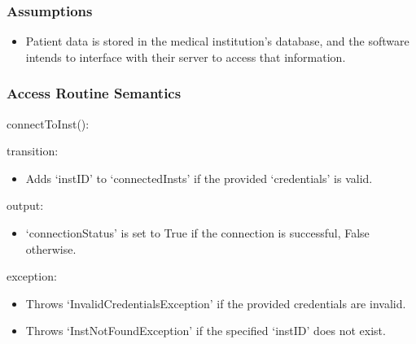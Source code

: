 \documentclass[12pt, titlepage]{article}
\begin{document}
\subsubsection{Assumptions}
\begin{itemize}
  \item Patient data is stored in the medical institution's database, and the software intends to interface with their server to access that information.
\end{itemize}

\subsubsection{Access Routine Semantics}

\noindent connectToInst():
\begin{itemize}
  \begin{item}
    transition:
    \begin{itemize}
      \item Adds `instID' to `connectedInsts' if the provided `credentials' is
        valid.
    \end{itemize}
  \end{item}
  \begin{item}
    output:
    \begin{itemize}
      \item `connectionStatus' is set to True if the connection is successful,
        False otherwise.
    \end{itemize}
  \end{item}
  \begin{item}
    exception:
    \begin{itemize}
      \item Throws `InvalidCredentialsException' if the provided credentials are invalid.
      \item Throws `InstNotFoundException' if the specified `instID' does not exist.
    \end{itemize}
  \end{item}
\end{itemize}

\end{document}
